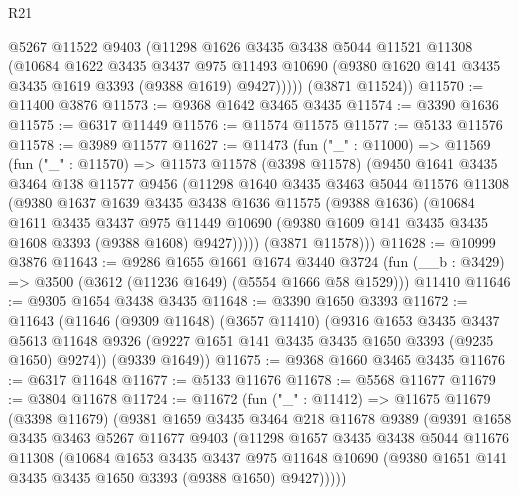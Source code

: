 \begin{lexlean}{R21}
\begin{coremodule}
          @5267
          @11522
          @9403
          (@11298
            @1626
            @3435
            @3438
            @5044
            @11521
            @11308
            (@10684
              @1622
              @3435
              @3437
              @975
              @11493
              @10690
              (@9380 @1620 @141 @3435 @3435 @1619 @3393 (@9388 @1619) @9427)))))
      (@3871 @11524))
@11570 := @11400 @3876
@11573 := @9368 @1642 @3465 @3435
@11574 := @3390 @1636
@11575 := @6317 @11449
@11576 := @11574 @11575
@11577 := @5133 @11576
@11578 := @3989 @11577
@11627 := @11473
    (fun ("_" : @11000) =>
    @11569
      (fun ("_" : @11570) =>
      @11573
        @11578
        (@3398 @11578)
        (@9450
          @1641
          @3435
          @3464
          @138
          @11577
          @9456
          (@11298
            @1640
            @3435
            @3463
            @5044
            @11576
            @11308
            (@9380
              @1637
              @1639
              @3435
              @3438
              @1636
              @11575
              (@9388 @1636)
              (@10684
                @1611
                @3435
                @3437
                @975
                @11449
                @10690
                (@9380 @1609 @141 @3435 @3435 @1608 @3393 (@9388 @1608) @9427)))))
        (@3871 @11578)))
@11628 := @10999 @3876
@11643 := @9286
    @1655
    @1661
    @1674
    @3440
    @3724
    (fun (__b : @3429) => @3500 (@3612 (@11236 @1649) (@5554 @1666 @58 @1529)))
    @11410
@11646 := @9305 @1654 @3438 @3435
@11648 := @3390 @1650 @3393
@11672 := @11643
    (@11646
      (@9309 @11648)
      (@3657 @11410)
      (@9316
        @1653
        @3435
        @3437
        @5613
        @11648
        @9326
        (@9227 @1651 @141 @3435 @3435 @1650 @3393 (@9235 @1650) @9274))
      (@9339 @1649))
@11675 := @9368 @1660 @3465 @3435
@11676 := @6317 @11648
@11677 := @5133 @11676
@11678 := @5568 @11677
@11679 := @3804 @11678
@11724 := @11672
    (fun ("_" : @11412) =>
    @11675
      @11679
      (@3398 @11679)
      (@9381
        @1659
        @3435
        @3464
        @218
        @11678
        @9389
        (@9391
          @1658
          @3435
          @3463
          @5267
          @11677
          @9403
          (@11298
            @1657
            @3435
            @3438
            @5044
            @11676
            @11308
            (@10684
              @1653
              @3435
              @3437
              @975
              @11648
              @10690
              (@9380 @1651 @141 @3435 @3435 @1650 @3393 (@9388 @1650) @9427)))))

\end{coremodule}
\end{lexlean}
